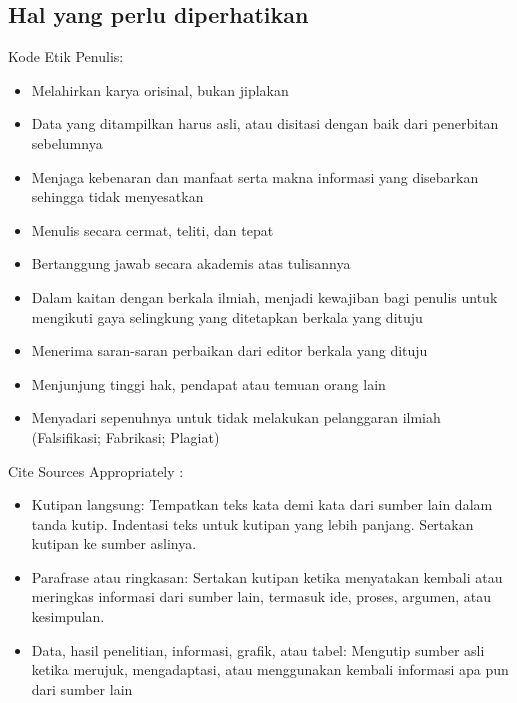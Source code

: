 \subsection{Hal yang perlu diperhatikan}
Kode Etik Penulis:
\begin{itemize}
    \item Melahirkan karya orisinal, bukan jiplakan
    \item Data yang ditampilkan harus asli, atau disitasi dengan baik dari penerbitan sebelumnya
    \item Menjaga kebenaran dan manfaat serta makna informasi yang disebarkan sehingga tidak menyesatkan
    \item Menulis secara cermat, teliti, dan tepat
    \item Bertanggung jawab secara akademis atas tulisannya
    \item Dalam kaitan dengan berkala ilmiah, menjadi kewajiban bagi penulis untuk mengikuti gaya selingkung yang ditetapkan berkala yang dituju
    \item Menerima saran-saran perbaikan dari editor berkala yang dituju
    \item Menjunjung tinggi hak, pendapat atau temuan orang lain
    \item Menyadari sepenuhnya untuk tidak melakukan pelanggaran ilmiah (Falsifikasi; Fabrikasi; Plagiat)
\end{itemize}
Cite Sources Appropriately :
\begin{itemize}
    \item Kutipan langsung: Tempatkan teks kata demi kata dari sumber lain dalam tanda kutip. Indentasi teks untuk kutipan yang lebih panjang. Sertakan kutipan ke sumber aslinya.
    \item Parafrase atau ringkasan: Sertakan kutipan ketika menyatakan kembali atau meringkas informasi dari sumber lain, termasuk ide, proses, argumen, atau kesimpulan.
    \item Data, hasil penelitian, informasi, grafik, atau tabel: Mengutip sumber asli ketika merujuk, mengadaptasi, atau menggunakan kembali informasi apa pun dari sumber lain
\end{itemize}
